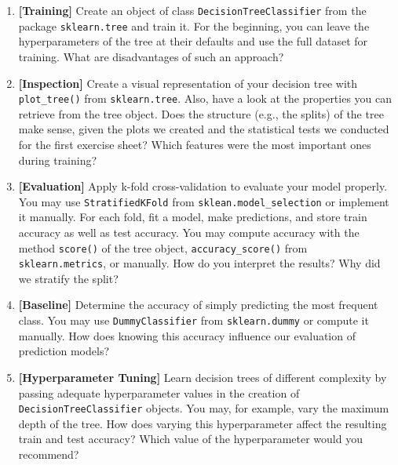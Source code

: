 \documentclass[12pt]{article}
\newcommand{\code}[1]{\textcolor{kitgreen}{\texttt{#1}}}
\newcommand{\taskname}[1]{\textcolor{kitblue}{\textbf{[#1]}}}
\begin{document}
\begin{enumerate}[label=\alph*), left=0pt, itemsep=12pt]
	\item
	\taskname{Training}
	Create an object of class \code{DecisionTreeClassifier} from the package \code{sklearn.tree} and train it.
	For the beginning, you can leave the hyperparameters of the tree at their defaults and use the full dataset for training.
	\newline
	What are disadvantages of such an approach?
	\item
	\taskname{Inspection}
	Create a visual representation of your decision tree with \code{plot\_tree()} from \code{sklearn.tree}.
	Also, have a look at the properties you can retrieve from the tree object.
	\newline
	Does the structure (e.g., the splits) of the tree make sense, given the plots we created and the statistical tests we conducted for the first exercise sheet?
	Which features were the most important ones during training?
	\item
	\taskname{Evaluation}
	Apply k-fold cross-validation to evaluate your model properly.
	You may use \code{StratifiedKFold} from \code{sklean.model\_selection} or implement it manually.
	For each fold, fit a model, make predictions, and store train accuracy as well as test accuracy.
	You may compute accuracy with the method \code{score()} of the tree object, \code{accuracy\_score()} from \code{sklearn.metrics}, or manually.
	\newline
	How do you interpret the results?
	Why did we stratify the split?
	\item
	\taskname{Baseline}
	Determine the accuracy of simply predicting the most frequent class.
	You may use \code{DummyClassifier} from \code{sklearn.dummy} or compute it manually.
	\newline
	How does knowing this accuracy influence our evaluation of prediction models?
	\item
	\taskname{Hyperparameter Tuning}
	Learn decision trees of different complexity by passing adequate hyperparameter values in the creation of \code{DecisionTreeClassifier} objects.
	You may, for example, vary the maximum depth of the tree.
	\newline
	How does varying this hyperparameter affect the resulting train and test accuracy?
	Which value of the hyperparameter would you recommend?
\end{enumerate}
\end{document}
